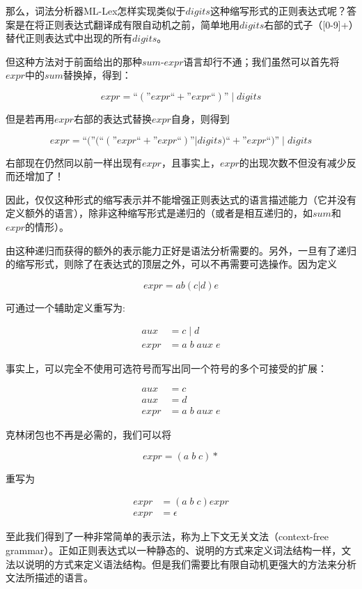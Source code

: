 \documentclass[cn,11pt,chinese]{elegantbook}
\begin{document}
那么，词法分析器ML-Lex怎样实现类似于$digits$这种缩写形式的正则表达式呢？答案是在将正则表达式翻译成有限自动机之前，简单地用$digits$右部的式子（[0-9]+）替代正则表达式中出现的所有$digits$。

但这种方法对于前面给出的那种$sum$-$expr$语言却行不通；我们虽然可以首先将$expr$中的$sum$替换掉，得到：

$$
expr=\text{``}(\text{''}expr\text{``}+\text{''}expr\text{``})\text{''} \; | \; digits
$$

但是若再用$expr$右部的表达式替换$expr$自身，则得到

$$
expr=\text{``}(\text{''}(\text{``}(\text{''}expr\text{``}+\text{''}expr\text{``})\text{''}|digits)\text{``}+\text{''}expr\text{``})\text{''} \; | \; digits
$$

右部现在仍然同以前一样出现有$expr$，且事实上，$expr$的出现次数不但没有减少反而还增加了！

因此，仅仅这种形式的缩写表示并不能增强正则表达式的语言描述能力（它并没有定义额外的语言），除非这种缩写形式是递归的（或者是相互递归的，如$sum$和$expr$的情形）。

由这种递归而获得的额外的表示能力正好是语法分析需要的。另外，一旦有了递归的缩写形式，则除了在表达式的顶层之外，可以不再需要可选操作。因为定义

$$
expr=ab(c|d)e
$$

可通过一个辅助定义重写为:

\begin{align*}
aux &= c \; | \; d \\
expr &=a \; b \; aux \; e  
\end{align*}

事实上，可以完全不使用可选符号而写出同一个符号的多个可接受的扩展：

\begin{align*}
aux &= c \\
aux &= d \\
expr &= a \; b \; aux \; e
\end{align*}

克林闭包也不再是必需的，我们可以将

$$
expr=(a \; b \; c)*
$$

重写为

\begin{align*}
expr &= (a \; b \; c)expr \\
expr &= \epsilon
\end{align*}

至此我们得到了一种非常简单的表示法，称为上下文无关文法（context-free grammar）。正如正则表达式以一种静态的、说明的方式来定义词法结构一样，文法以说明的方式来定义语法结构。但是我们需要比有限自动机更强大的方法来分析文法所描述的语言。
\end{document}
